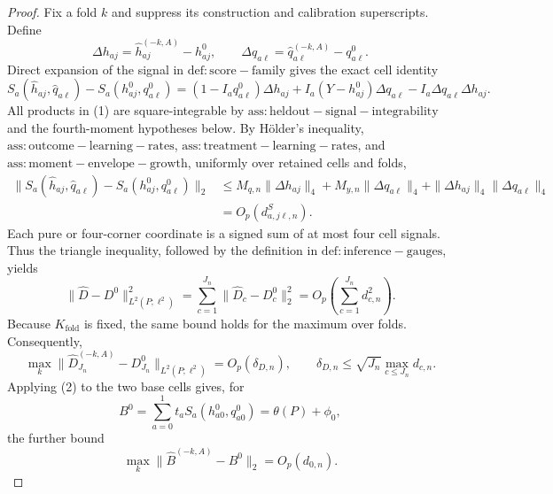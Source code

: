 \documentclass{article}
\begin{document}
\begin{proof}
Fix a fold \(k\) and suppress its construction and calibration superscripts.  Define
\[
 \Delta h_{aj}=\widehat h_{aj}^{(-k,A)}-h^0_{aj},\qquad
 \Delta q_{a\ell}=\widehat q_{a\ell}^{(-k,A)}-q^0_{a\ell}.
\]
Direct expansion of the signal in \(\mathrm{def:score-family}\) gives the exact cell identity
\[
 S_a(\widehat h_{aj},\widehat q_{a\ell})-S_a(h^0_{aj},q^0_{a\ell})
 =(1-I_aq^0_{a\ell})\Delta h_{aj}
 +I_a(Y-h^0_{aj})\Delta q_{a\ell}
 -I_a\Delta q_{a\ell}\Delta h_{aj}.                                      \tag{1}
\]
All products in (1) are square-integrable by \(\mathrm{ass:heldout-signal-integrability}\) and the fourth-moment hypotheses below.  By H\"older's inequality, \(\mathrm{ass:outcome-learning-rates}\), \(\mathrm{ass:treatment-learning-rates}\), and \(\mathrm{ass:moment-envelope-growth}\), uniformly over retained cells and folds,
\[
\begin{aligned}
 \|S_a(\widehat h_{aj},\widehat q_{a\ell})-S_a(h^0_{aj},q^0_{a\ell})\|_2
 &\le M_{q,n}\|\Delta h_{aj}\|_4+M_{y,n}\|\Delta q_{a\ell}\|_4
       +\|\Delta h_{aj}\|_4\|\Delta q_{a\ell}\|_4\\
 &=O_p(d^S_{a,j\ell,n}).                                                    \tag{2}
\end{aligned}
\]
Each pure or four-corner coordinate is a signed sum of at most four cell signals.  Thus the triangle inequality, followed by the definition in \(\mathrm{def:inference-gauges}\), yields
\[
 \|\widehat D-D^0\|_{L^2(P;\ell^2)}^2
 =\sum_{c=1}^{J_n}\|\widehat D_c-D_c^0\|_2^2
 =O_p\!\left(\sum_{c=1}^{J_n}d_{c,n}^2\right).
\]
Because \(K_{\mathrm{fold}}\) is fixed, the same bound holds for the maximum over folds.  Consequently,
\[
 \max_k\|\widehat D_{J_n}^{(-k,A)}-D^0_{J_n}\|_{L^2(P;\ell^2)}
 =O_p(\delta_{D,n}),\qquad
 \delta_{D,n}\le \sqrt{J_n}\max_{c\le J_n}d_{c,n}.                       \tag{3}
\]
Applying (2) to the two base cells gives, for
\[
 B^0=\sum_{a=0}^1t_aS_a(h^0_{a0},q^0_{a0})=\theta(P)+\phi_0,
\]
the further bound
\[
 \max_k\|\widehat B^{(-k,A)}-B^0\|_2=O_p(d_{0,n}).                         \tag{4}
\]


\end{proof}
\end{document}
